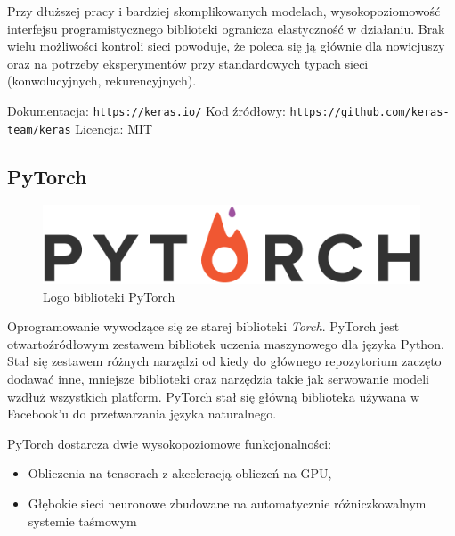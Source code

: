 \documentclass[12pt,a4paper,twoside,titlepage,openright]{book}
\begin{document}
\begin{itemize}
\begin{itemize}
Przy dłuższej pracy i bardziej skomplikowanych modelach, wysokopoziomowość interfejsu programistycznego biblioteki ogranicza elastyczność w działaniu. Brak wielu możliwości kontroli sieci powoduje, że poleca się ją głównie dla nowicjuszy oraz na potrzeby eksperymentów przy standardowych typach sieci (konwolucyjnych, rekurencyjnych).

\noindent
\newline 
Dokumentacja: \texttt{https://keras.io/}
\newline 
Kod źródłowy: \texttt{https://github.com/keras-team/keras}
\newline 
Licencja: MIT

\subsection{PyTorch}
\begin{figure}[ht]
	\centering
			\includegraphics[resolution=100, scale=0.5]{PyTorch.png}
		\caption{Logo biblioteki PyTorch}
\end{figure}

Oprogramowanie wywodzące się ze starej biblioteki \textit{Torch}. PyTorch jest otwartoźródłowym zestawem bibliotek uczenia maszynowego dla języka Python. Stał się zestawem różnych narzędzi od kiedy do głównego repozytorium zaczęto dodawać inne, mniejsze biblioteki oraz narzędzia takie jak serwowanie modeli wzdłuż wszystkich platform. PyTorch stał się główną biblioteka używana w Facebook'u do przetwarzania języka naturalnego. 

PyTorch dostarcza dwie wysokopoziomowe funkcjonalności:
\begin{itemize}
\item Obliczenia na tensorach z akceleracją obliczeń na GPU,
\item Głębokie sieci neuronowe zbudowane na automatycznie różniczkowalnym systemie taśmowym
\end{itemize}


\end{itemize}
\end{itemize}
\end{document}
